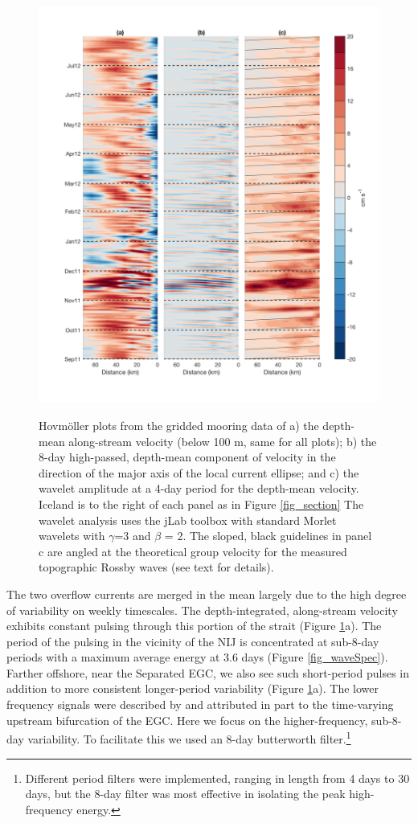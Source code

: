 \documentclass[12pt,titlepage,figuresatend]{article}
\begin{document}
\begin{figure}[p!]
  \centering\includegraphics[width=\hsize]{./figures/hoff_vars.pdf}
  \caption{Hovm\"{o}ller plots from the gridded mooring data of a) the depth-mean along-stream velocity (below 100 m, same for all plots); b) the 8-day high-passed, depth-mean component of velocity in the direction of the major axis of the local current ellipse; and c) the wavelet amplitude at a 4-day period for the depth-mean velocity. Iceland is to the right of each panel as in Figure \ref{fig_section} The wavelet analysis uses the jLab toolbox \cite[]{Lilly2017} with standard Morlet wavelets with $\gamma$=3 and $\beta$ = 2. The sloped, black guidelines in panel c are angled at the theoretical group velocity for the measured topographic Rossby waves (see text for details).}{\label{fig_hoff}}
\end{figure}


The two overflow currents are merged in the mean largely due to the high degree of variability on weekly timescales. The depth-integrated, along-stream velocity exhibits constant pulsing through this portion of the strait (Figure \ref{fig_hoff}a). The period of the pulsing in the vicinity of the NIJ is concentrated at sub-8-day periods with a maximum average energy at 3.6 days (Figure \ref{fig_waveSpec}). Farther offshore, near the Separated EGC, we also see such short-period pulses in addition to more consistent longer-period variability (Figure \ref{fig_hoff}a). The lower frequency signals were described by \cite{Harden2016} and attributed in part to the time-varying upstream bifurcation of the EGC. Here we focus on the higher-frequency, sub-8-day variability. To facilitate this we used an 8-day butterworth filter.\footnote{Different period filters were implemented, ranging in length from 4 days to 30 days, but the 8-day filter was most effective in isolating the peak high-frequency energy.}
\end{document}

